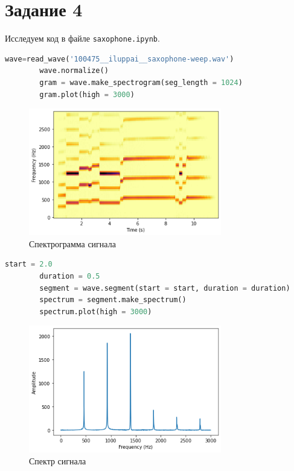 \documentclass[a4paper, 12pt]{report}
\begin{document}
	\section{Задание 4}
	Исследуем код в файле \texttt{saxophone.ipynb}.
	\begin{lstlisting}[language=Python,caption=Получение сигнала]
		wave=read_wave('100475__iluppai__saxophone-weep.wav')
		wave.normalize()
		gram = wave.make_spectrogram(seg_length = 1024)
		gram.plot(high = 3000)
	\end{lstlisting}
	\begin{figure}[H]
		\centering
		\includegraphics[width=0.75\textwidth]{sax1.png}
		\caption{Спектрограмма сигнала}
		\label{fig:sax1}
	\end{figure}
	\begin{lstlisting}[language=Python,caption=Продолжаем исследование]
		start = 2.0
		duration = 0.5
		segment = wave.segment(start = start, duration = duration)
		spectrum = segment.make_spectrum()
		spectrum.plot(high = 3000)
	\end{lstlisting}
	\begin{figure}[H]
		\centering
		\includegraphics[width=0.75\textwidth]{sax2.png}
		\caption{Спектр сигнала}
		\label{fig:sax2}
	\end{figure}
\end{document}
